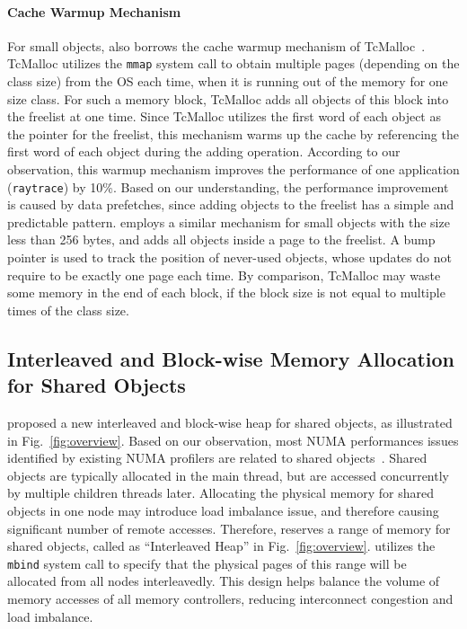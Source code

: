 
\paragraph{Cache Warmup Mechanism} For small objects, \NM{} also borrows the cache warmup mechanism of TcMalloc~\cite{tcmalloc}. TcMalloc utilizes the \texttt{mmap} system call to obtain multiple pages (depending on the class size) from the OS each time, when it is running out of the memory for one size class. For such a memory block, TcMalloc adds all objects of this block into the freelist at one time. Since TcMalloc utilizes the first word of each object as the pointer for the freelist, this mechanism warms up the cache by referencing the first word of each object during the adding operation. According to our observation, this warmup mechanism improves the performance of one application (\texttt{raytrace}) by 10\%. Based on our understanding, the performance improvement is caused by data prefetches, since adding objects to the freelist has a simple and predictable pattern. \NM{} employs a similar mechanism for small objects with the size less than 256 bytes, and adds all objects inside a page to the freelist. A bump pointer is used to track the position of never-used objects, whose updates do not require to be exactly one page each time. By comparison, TcMalloc may waste some memory in the end of each block, if the block size is not equal to multiple times of the class size.   

\subsection{Interleaved and Block-wise Memory Allocation for Shared Objects} 
\label{sec:mainthread}

\NA{} proposed a new interleaved and block-wise heap for shared objects, as illustrated in Fig.~\ref{fig:overview}. Based on our observation, most NUMA performances issues identified by existing NUMA profilers are related to shared objects~\cite{XULIU, MemProf}. Shared objects are typically allocated in the main thread, but are accessed concurrently by multiple children threads later. Allocating the physical memory for shared objects in one node may introduce load imbalance issue, and therefore causing significant number of remote accesses. Therefore, \NA{} reserves a range of memory for shared objects, called as ``Interleaved Heap'' in Fig.~\ref{fig:overview}. \NA{} utilizes the \texttt{mbind} system call to specify that the physical pages of this range will be allocated from all nodes interleavedly. This design helps balance the volume of memory accesses of all memory controllers, reducing interconnect congestion and load imbalance. 

